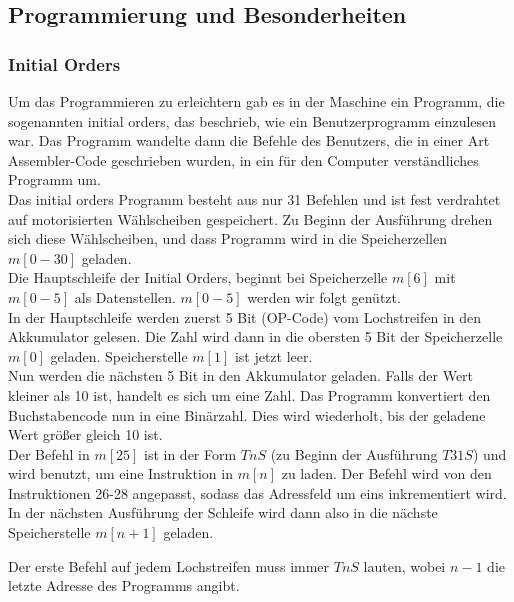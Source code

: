 \documentclass[12pt]{report}
\begin{document}
\subsection{Programmierung und Besonderheiten}

\subsubsection{Initial Orders}
Um das Programmieren zu erleichtern gab es in der Maschine ein Programm, die sogenannten initial orders, das beschrieb, wie ein Benutzerprogramm einzulesen war. Das Programm wandelte dann die Befehle des Benutzers, die in einer Art Assembler-Code geschrieben wurden, in ein für den Computer verständliches Programm um.\\

Das initial orders Programm besteht aus nur 31 Befehlen und ist fest verdrahtet auf motorisierten Wählscheiben gespeichert. Zu Beginn der Ausführung drehen sich diese Wählscheiben, und dass Programm wird in die Speicherzellen $m[0-30]$ geladen.\\

Die Hauptschleife der Initial Orders, beginnt bei Speicherzelle $m[6]$ mit $m[0-5]$ als Datenstellen. $m[0-5]$ werden wir folgt genützt.\\

In der Hauptschleife werden zuerst 5 Bit (OP-Code) vom Lochstreifen in den Akkumulator gelesen. Die Zahl wird dann in die obersten 5 Bit der Speicherzelle $m[0]$ geladen. Speicherstelle $m[1]$ ist jetzt leer.\\
Nun werden die nächsten 5 Bit in den Akkumulator geladen. Falls der Wert kleiner als 10 ist, handelt es sich um eine Zahl. Das Programm konvertiert den Buchstabencode nun in eine Binärzahl. Dies wird wiederholt, bis der geladene Wert größer gleich 10 ist.\\

Der Befehl in $m[25]$ ist in der Form $TnS$ (zu Beginn der Ausführung $T31S$) und wird benutzt, um eine Instruktion in $m[n]$ zu laden. Der Befehl wird von den Instruktionen 26-28 angepasst, sodass das Adressfeld um eins inkrementiert wird. In der nächsten Ausführung der Schleife wird dann also in die nächste Speicherstelle $m[n+1]$ geladen. 

Der erste Befehl auf jedem Lochstreifen muss immer $TnS$ lauten, wobei $n-1$ die letzte Adresse des Programms angibt.\\
\end{document}
